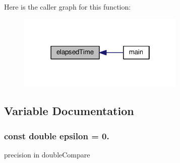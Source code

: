 Here is the caller graph for this function\-:\nopagebreak
\begin{figure}[H]
\begin{center}
\leavevmode
\includegraphics[width=226pt]{utility_8hh_affb98702b6d646743be567444260ac1f_icgraph}
\end{center}
\end{figure}




\subsection{Variable Documentation}
\hypertarget{utility_8hh_ac29df3dcbefa1ce189e5990bde994025}{
\subsubsection[{epsilon}]{\setlength{\rightskip}{0pt plus 5cm}const double epsilon = 0.}}\label{utility_8hh_ac29df3dcbefa1ce189e5990bde994025}


precision in double\-Compare 


